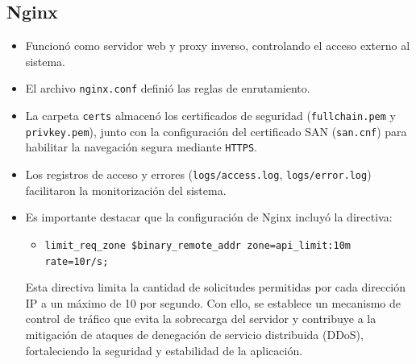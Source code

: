 \documentclass[letter,oneside,12pt,spanish]{report}
\begin{document}
\subsection{Nginx}
\begin{itemize}
    \item Funcionó como servidor web y proxy inverso, controlando el acceso externo al sistema.
    \item El archivo \texttt{nginx.conf} definió las reglas de enrutamiento.
    \item La carpeta \texttt{certs} almacenó los certificados de seguridad (\texttt{fullchain.pem} y \texttt{privkey.pem}), junto con la configuración del certificado SAN (\texttt{san.cnf}) para habilitar la navegación segura mediante \texttt{HTTPS}.
    \item Los registros de acceso y errores (\texttt{logs/access.log}, \texttt{logs/error.log}) facilitaron la monitorización del sistema.
	\item Es importante destacar que la configuración de Nginx incluyó la directiva:
    
    \begin{itemize}
        \item \texttt{limit\_req\_zone \$binary\_remote\_addr zone=api\_limit:10m rate=10r/s;}
    \end{itemize}
    
    Esta directiva limita la cantidad de solicitudes permitidas por cada dirección IP a un máximo de 10 por segundo. Con ello, se establece un mecanismo de control de tráfico que evita la sobrecarga del servidor y contribuye a la mitigación de ataques de denegación de servicio distribuida (DDoS), fortaleciendo la seguridad y estabilidad de la aplicación.
\end{itemize}
\end{document}
